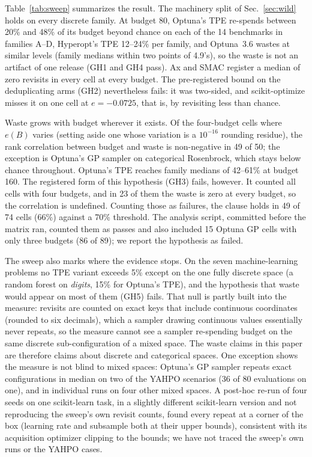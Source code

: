 \documentclass[%
 aip,
 amsmath,amssymb,
 floatfix,
 reprint,%
]{revtex4-1}
\begin{document}
Table~\ref{tab:sweep} summarizes the result. The machinery split of
Sec.~\ref{sec:wild} holds on every discrete family. At budget 80,
Optuna's TPE re-spends between 20\% and 48\% of its budget beyond
chance on each of the 14 benchmarks in families A--D, Hyperopt's TPE
12--24\% per family, and Optuna~3.6 wastes at similar levels (family
medians within two points of 4.9's), so the waste is not an artifact of
one release (GH1 and GH4 pass). Ax and SMAC register a median of zero
revisits in every cell at every budget. The pre-registered bound on the
deduplicating arms (GH2) nevertheless fails: it was two-sided, and
scikit-optimize misses it on one cell at $e = -0.0725$, that is, by
revisiting less than chance.

Waste grows with budget wherever it exists. Of the four-budget cells
where $e(B)$ varies (setting aside one whose variation is a
$10^{-16}$ rounding residue), the rank correlation between budget and
waste is non-negative in 49 of 50; the exception is Optuna's GP
sampler on categorical Rosenbrock, which stays below chance throughout.
Optuna's TPE reaches family medians of 42--61\% at budget 160. The
registered form of this hypothesis (GH3) fails, however. It counted all
cells with four budgets, and in 23 of them the waste is zero at every
budget, so the correlation is undefined. Counting those as failures,
the clause holds in 49 of 74 cells (66\%) against a 70\% threshold. The
analysis script, committed before the matrix ran, counted them as
passes and also included 15 Optuna GP cells with only three budgets
(86 of 89); we report the hypothesis as failed.

The sweep also marks where the evidence stops. On the seven
machine-learning problems no TPE variant exceeds 5\% except on the one
fully discrete space (a random forest on \textit{digits}, 15\% for
Optuna's TPE), and the hypothesis that waste would appear on most of
them (GH5) fails. That null is partly built into the measure: revisits
are counted on exact keys that include continuous coordinates (rounded
to six decimals), which a sampler drawing continuous values essentially
never repeats, so the measure cannot see a sampler re-spending budget on
the same discrete sub-configuration of a mixed space. The waste claims
in this paper are therefore claims about discrete and categorical
spaces. One exception shows the measure is not blind to mixed spaces:
Optuna's GP sampler repeats exact configurations in median on two of
the YAHPO scenarios (36 of 80 evaluations on one), and in individual
runs on four other mixed spaces. A post-hoc re-run of four seeds on one
scikit-learn task, in a slightly different scikit-learn version and not
reproducing the sweep's own revisit counts, found every repeat at a
corner of the box (learning rate and subsample both at their upper
bounds), consistent with its acquisition optimizer clipping to the
bounds; we have not traced the sweep's own runs or the YAHPO cases.
\end{document}
